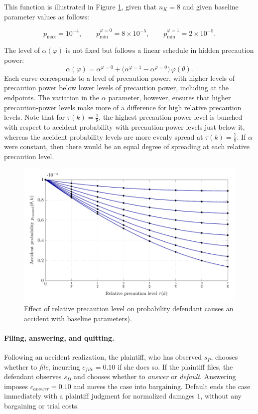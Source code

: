 \documentclass{article}
\begin{document}
This function is illustrated in Figure \ref{fig:precaution.pdf}, given that $n_K = 8$ and given baseline parameter values as follows:

\[
p_{\max}=10^{-4}, \qquad 
p_{\min}^{\varphi=0}=8\times 10^{-5}, \qquad 
p_{\min}^{\varphi=1}=2\times 10^{-5}.
\]

The level of $\alpha(\varphi)$ is not fixed but follows a linear schedule in hidden precaution power:
\[
\alpha(\varphi) = \alpha^{\varphi=0} + 
\bigl(\alpha^{\varphi=1}-\alpha^{\varphi=0}\bigr)\,\varphi(\theta).
\]
Each curve corresponds to a level of precaution power, with higher levels of precaution power below lower levels of precaution power, including at the endpoints. The variation in the $\alpha$ parameter, however, ensures that higher precaution-power levels make more of a difference for high relative precaution levels. Note that for $\tau(k) = \frac{1}{8}$, the highest precaution-power level is bunched with respect to accident probability with precaution-power levels just below it, whereas the accident probability levels are more evenly spread at $\tau(k) = \frac{7}{8}$. If $\alpha$ were constant, then there would be an equal degree of spreading at each relative precaution level.

  \begin{figure}[t]
    \centering
    \includegraphics[width=\textwidth]{../Figures/precaution.pdf}
    \caption{Effect of relative precaution level on probability defendant causes an accident with baseline parameters).}
    \label{fig:precaution.pdf}
  \end{figure}

\paragraph{Filing, answering, and quitting.}
Following an accident realization, the plaintiff, who has observed $s_P$, chooses whether to \emph{file}, incurring $c_{file}=0.10$ if she does so. If the plaintiff files, the defendant observes $s_D$ and chooses whether to \emph{answer} or \emph{default}. Answering imposes $c_{answer}=0.10$ and moves the case into bargaining. Default ends the case immediately with a plaintiff judgment for normalized damages $1$, without any bargaining or trial costs.
\end{document}
